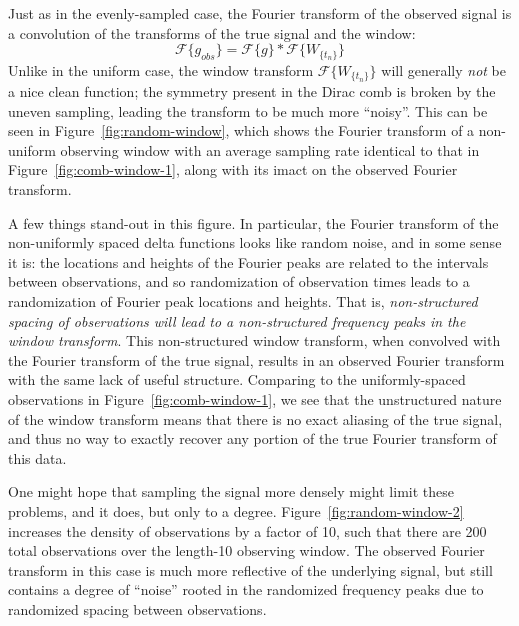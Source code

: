 \documentclass[preprint]{aastex}
\newcommand{\Fig}[1]{Figure~\ref{fig:#1}}
\newcommand{\fig}[1]{Figure~\ref{fig:#1}}
\newcommand{\eqlabel}[1]{\label{eq:#1}}
\begin{document}
Just as in the evenly-sampled case, the Fourier transform of the observed
signal is a convolution of the transforms of the true signal and the window:
\begin{equation}
  \mathcal{F}\{g_{obs}\} = \mathcal{F}\{g\} \ast \mathcal{F}\{W_{\{t_n\}}\}
  \eqlabel{g-obs-conv}
\end{equation}
Unlike in the uniform case, the window transform $\mathcal{F}\{W_{\{t_n\}}\}$
will generally {\it not} be a nice clean function; the symmetry present in
the Dirac comb is broken by the uneven sampling,
leading the transform to be much more ``noisy''.
This can be seen in \fig{random-window}, which shows the Fourier transform of
a non-uniform observing window with an average sampling rate identical to
that in \fig{comb-window-1}, along with its imact on the observed Fourier
transform.

A few things stand-out in this figure. In particular, the Fourier transform of
the non-uniformly spaced delta functions looks like random noise, and in some
sense it is: the locations and heights of the Fourier peaks are related to
the intervals between observations, and so randomization of observation times
leads to a randomization of Fourier peak locations and heights.
That is, {\it non-structured spacing of observations will lead to
a non-structured frequency peaks in the window transform}.
This non-structured window transform, when convolved with the Fourier transform
of the true signal, results in an observed Fourier transform with the same
lack of useful structure.
Comparing to the uniformly-spaced observations in \fig{comb-window-1}, we
see that the unstructured nature of the window transform means that there
is no exact aliasing of the true signal, and thus no way to exactly recover
any portion of the true Fourier transform of this data.

One might hope that sampling the signal more densely might limit these problems,
and it does, but only to a degree.
\Fig{random-window-2} increases the density of observations by a factor of 10,
such that there are 200 total observations over the length-10 observing window.
The observed Fourier transform in this case is much more reflective of the
underlying signal, but still contains a degree of ``noise'' rooted in the
randomized frequency peaks due to randomized spacing between observations.
\end{document}

